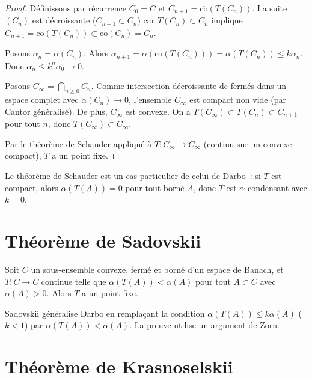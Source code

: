 \begin{proof}
D\'efinissons par r\'ecurrence $C_0 = C$ et $C_{n+1} = \overline{\mathrm{co}}(T(C_n))$.
La suite $(C_n)$ est d\'ecroissante ($C_{n+1} \subset C_n$) car $T(C_n) \subset C_n$
implique $C_{n+1} = \overline{\mathrm{co}}(T(C_n)) \subset \overline{\mathrm{co}}(C_n) = C_n$.

Posons $\alpha_n = \alpha(C_n)$. Alors
$\alpha_{n+1} = \alpha(\overline{\mathrm{co}}(T(C_n))) = \alpha(T(C_n)) \leq k \alpha_n$.
Donc $\alpha_n \leq k^n \alpha_0 \to 0$.

Posons $C_\infty = \bigcap_{n \geq 0} C_n$. Comme intersection d\'ecroissante de
ferm\'es dans un espace complet avec $\alpha(C_n) \to 0$, l'ensemble $C_\infty$
est compact non vide (par Cantor g\'en\'eralis\'e). De plus, $C_\infty$ est convexe.
On a $T(C_\infty) \subset T(C_n) \subset C_{n+1}$ pour tout $n$, donc
$T(C_\infty) \subset C_\infty$.

Par le th\'eor\`eme de Schauder appliqu\'e \`a $T : C_\infty \to C_\infty$ (continu
sur un convexe compact), $T$ a un point fixe.
\end{proof}

\begin{remarque}
Le th\'eor\`eme de Schauder est un cas particulier de celui de Darbo~: si $T$ est
compact, alors $\alpha(T(A)) = 0$ pour tout born\'e $A$, donc $T$ est
$\alpha$-condensant avec $k = 0$.
\end{remarque}

\section{Th\'eor\`eme de Sadovskii}

\begin{theoreme}[Sadovskii, 1967]
Soit $C$ un sous-ensemble convexe, ferm\'e et born\'e d'un espace de Banach, et
$T : C \to C$ continue telle que $\alpha(T(A)) < \alpha(A)$ pour tout
$A \subset C$ avec $\alpha(A) > 0$. Alors $T$ a un point fixe.
\end{theoreme}

\begin{remarque}
Sadovskii g\'en\'eralise Darbo en rempla\c{c}ant la condition
$\alpha(T(A)) \leq k\alpha(A)$ ($k < 1$) par $\alpha(T(A)) < \alpha(A)$.
La preuve utilise un argument de Zorn.
\end{remarque}

\section{Th\'eor\`eme de Krasnoselskii}

